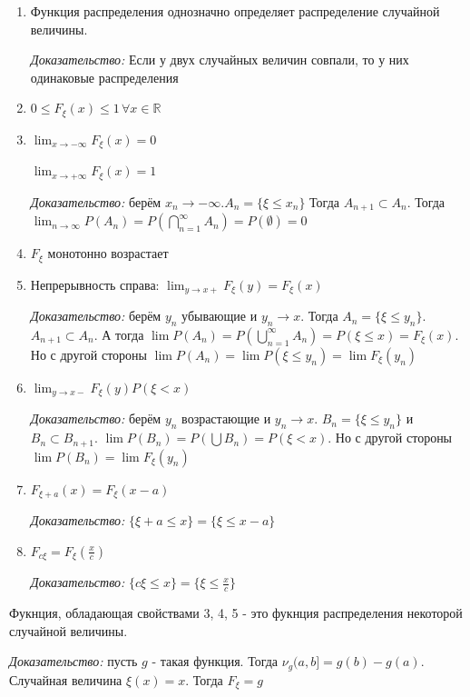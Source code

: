 \begin{properties}
    \begin{enumerate}
        \item {
        Функция распределения однозначно определяет распределение
        случайной величины.

        \textit{Доказательство:} Если у двух случайных величин совпали, то у них одинаковые
        распределения
        }
        \item {
            $0 \leqslant F_{\xi}(x) \leqslant 1 \, \forall x \in \mathbb{R}$
        }

        \item {
            $\lim_{x \to -\infty} F_{\xi} (x) = 0$

            $\lim_{x \to +\infty} F_{\xi} (x) = 1$

            \textit{Доказательство:} берём $x_n \to -\infty. A_n = \{ \xi \leqslant x_n \} $
            Тогда $A_{n + 1} \subset A_n$. Тогда $\lim_{n \to \infty} P(A_n) = 
            P(\bigcap_{n = 1}^{\infty} A_n) = P(\emptyset) = 0$
        } 
        \item {
            $F_{\xi}$ монотонно возрастает
        }
        \item {
            Непрерывность справа: $\lim_{y \to x+} F_{\xi} (y) = F_{\xi} (x)$

            \textit{Доказательство:} берём $y_n$ убывающие и $y_n \to x$.
            Тогда $A_n = \{ \xi \leqslant y_n \}$. $A_{n + 1} \subset A_n$.
            А тогда $\lim P(A_n) = P(\bigcup_{n = 1}^{\infty} A_n) = P(\xi \leqslant x) = F_{\xi} (x)$.
            Но с другой стороны $\lim P(A_n) = \lim P(\xi \leqslant y_n) = \lim F_{\xi} (y_n)$
        }
        \item {
            $\lim_{y \to x-} F_{\xi} (y) P(\xi < x)$

            \textit{Доказательство:} берём $y_n$ возрастающие и
            $y_n \to x$. $B_n = \{ \xi \leqslant y_n \}$ и $B_{n} \subset B_{n + 1}$.
            $\lim P(B_n) = P(\bigcup B_n) = P(\xi < x)$. Но с другой стороны
            $\lim P(B_n) = \lim F_{\xi} (y_n)$
        }
        \item {
            $F_{\xi + a} (x) = F_{\xi} (x - a)$

            \textit{Доказательство:} $\{ \xi + a \leqslant x \} = 
            \{ \xi \leqslant x - a \}$
        }
        \item {
            $F_{c\xi} = F_{\xi} (\frac{x}{c})$

            \textit{Доказательство:} $\{ c\xi \leqslant x \} = 
            \{ \xi \leqslant \frac{x}{c} \}$
        }
    \end{enumerate}

    \begin{remark}
        Фукнция, обладающая свойствами 3, 4, 5 - это фукнция распределения
        некоторой случайной величины.

        \textit{Доказательство:} пусть $g$ - такая функция. Тогда $\nu_g (a, b] = g(b) - g(a) $.
        Случайная величина $\xi (x) = x$. Тогда $F_{\xi} = g$
    \end{remark}

\end{properties}

